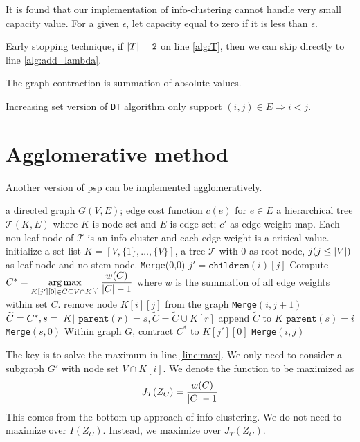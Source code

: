 \documentclass{article}
\begin{document}
It is found that our implementation of info-clustering cannot handle very small capacity value. For a given $\epsilon$, let capacity equal to zero if it is less than $\epsilon$.

Early stopping technique, if $\lvert T\rvert=2$ on line \ref{alg:T}, then we can skip directly to line \ref{alg:add_lambda}.

The graph contraction is summation of absolute values.

Increasing set version of  \texttt{DT} algorithm only support $(i,j) \in E \Rightarrow i<j$.

\section{Agglomerative method}
Another version of psp can be implemented agglomeratively.
\begin{algorithm}
\caption{}\label{alg:psp_agg}
\begin{algorithmic}[1]
\REQUIRE a directed graph $G(V, E)$; edge cost function $c(e)$ for $e\in E$
\ENSURE a hierarchical tree $\mathcal{T}(K, E)$ where $K$ is node set and $E$ is edge set; $c'$ as edge weight map. Each non-leaf node of $\mathcal{T}$ is an info-cluster and each edge weight is a critical value. 
\STATE initialize a set list $K=[V, \{1\}, \dots, \{V\}]$, a tree $\mathcal{T}$ with 0 as root node, $j(j\leq \lvert V\rvert)$ as leaf node and no stem node.
\STATE \texttt{Merge}(0,0)
\STATE $j' = \texttt{children}(i)[j]$
\STATE Compute $C^* =\displaystyle \operatorname*{arg\,max}_{K[j'][0] \in C \subseteq V \cap K[i]} \frac{w(C)}{\lvert C\rvert-1}$ where $w$ is the summation of all edge weights within set $C$. \label{line:max}
\STATE remove node $K[i][j]$ from the graph
\STATE \texttt{Merge}$(i,j+1)$
\ENDIF
\ELSE
\STATE $\widetilde{C} = C^*, s=\lvert K\rvert$
\STATE  $\texttt{parent}(r) = s, \widetilde{C} = \widetilde{C} \cup K[r]$
\ENDIF
\STATE append $\widetilde{C} $ to $K$
\ENDFOR
\STATE $\texttt{parent}(s) = i$
\STATE \texttt{Merge}$(s,0)$
\STATE Within graph $G$, contract $C^*$ to $K[j'][0]$
\STATE \texttt{Merge}$(i,j)$
\ENDIF
\ENDFUNCTION
\end{algorithmic}
\end{algorithm}
The key is to solve the maximum in line \ref{line:max}.
We only need to consider a subgraph $G'$ with node set $V \cap K[i]$.
We denote the function to be maximized as
\begin{equation}
J_T(Z_C) = \frac{w(C)}{\lvert C\rvert-1}
\end{equation}
This comes from the bottom-up approach of info-clustering. We do not need to maximize over $I(Z_C)$. Instead, we maximize over $J_T(Z_C)$.
\end{document}
